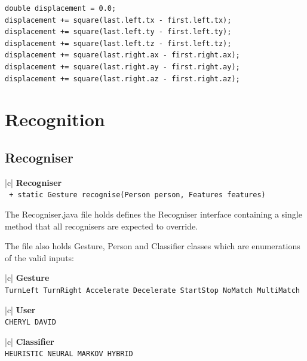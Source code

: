 \documentclass[12pt,a4,notitlepage]{report}
\renewcommand{\_}{\texttt{\symbol{95}}}
\newcommand{\<}{\texttt{\symbol{60}}}
\renewcommand{\>}{\texttt{\symbol{62}}}
\newcommand{\class}[1]{\textbf{#1}}
\newcommand{\variable}[1]{\texttt{#1}}
\begin{document}
{\begin{verbatim}
double displacement = 0.0;
displacement += square(last.left.tx - first.left.tx);
displacement += square(last.left.ty - first.left.ty);
displacement += square(last.left.tz - first.left.tz);
displacement += square(last.right.ax - first.right.ax);
displacement += square(last.right.ay - first.right.ay);
displacement += square(last.right.az - first.right.az);
\end{verbatim}

\newpage

\section{Recognition}

\subsection{Recogniser}

\begin{tabular}{|c|} \hline 
\class{Recogniser} \\ \hline
{}
{\variable{
+ static Gesture recognise(Person person, Features features)
 } } \\
\hline
\end{tabular}

The Recogniser.java file holds defines the Recogniser interface containing a single method that all recognisers are expected to override.

The file also holds Gesture, Person and Classifier classes which are enumerations of the valid inputs:

\begin{tabular}[t]{|c|} \hline 
\class{Gesture} \\ \hline
{}
{\variable{TurnLeft \newline TurnRight \newline Accelerate \newline Decelerate \newline StartStop \newline NoMatch \newline MultiMatch
} } \\ \hline
\end{tabular}\hfill
\begin{tabular}[t]{|c|} \hline 
\class{User} \\ \hline
{}
{\variable{CHERYL \newline DAVID
} } \\ \hline
\end{tabular}\hfill
\begin{tabular}[t]{|c|} \hline 
\class{Classifier} \\ \hline
{}
{\variable{HEURISTIC \newline NEURAL \newline MARKOV \newline HYBRID
} } \\ \hline
\end{tabular}

}
\end{document}
